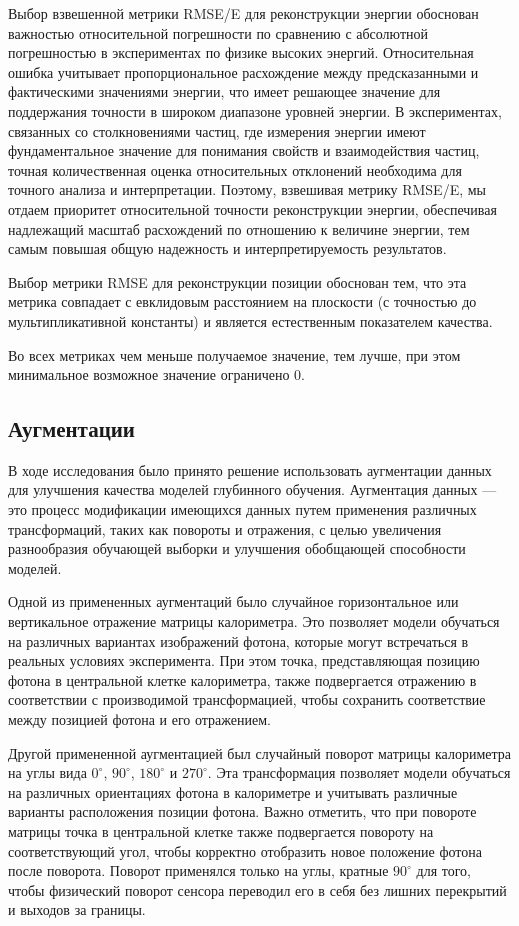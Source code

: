 \documentclass[a4paper,12pt]{extarticle}
\begin{document}
Выбор взвешенной метрики \textsf{RMSE/E} для реконструкции энергии обоснован важностью относительной погрешности по сравнению с абсолютной погрешностью в экспериментах по физике высоких энергий. Относительная ошибка учитывает пропорциональное расхождение между предсказанными и фактическими значениями энергии, что имеет решающее значение для поддержания точности в широком диапазоне уровней энергии. В экспериментах, связанных со столкновениями частиц, где измерения энергии имеют фундаментальное значение для понимания свойств и взаимодействия частиц, точная количественная оценка относительных отклонений необходима для точного анализа и интерпретации. Поэтому, взвешивая метрику \textsf{RMSE/E}, мы отдаем приоритет относительной точности реконструкции энергии, обеспечивая надлежащий масштаб расхождений по отношению к величине энергии, тем самым повышая общую надежность и интерпретируемость результатов.

Выбор метрики \textsf{RMSE} для реконструкции позиции обоснован тем, что эта метрика совпадает с евклидовым расстоянием на плоскости (с точностью до мультипликативной константы) и является естественным показателем качества.

Во всех метриках чем меньше получаемое значение, тем лучше, при этом минимальное возможное значение ограничено $0$.

\subsection{Аугментации}
\label{subsection:augmentations}

В ходе исследования было принято решение использовать аугментации данных для улучшения качества моделей глубинного обучения. Аугментация данных --- это процесс модификации имеющихся данных путем применения различных трансформаций, таких как повороты и отражения, с целью увеличения разнообразия обучающей выборки и улучшения обобщающей способности моделей.

Одной из примененных аугментаций было случайное горизонтальное или вертикальное отражение матрицы калориметра. Это позволяет модели обучаться на различных вариантах изображений фотона, которые могут встречаться в реальных условиях эксперимента. При этом точка, представляющая позицию фотона в центральной клетке калориметра, также подвергается отражению в соответствии с производимой трансформацией, чтобы сохранить соответствие между позицией фотона и его отражением.

Другой примененной аугментацией был случайный поворот матрицы калориметра на углы вида $0^{\circ}$, $90^{\circ}$, $180^{\circ}$ и $270^{\circ}$. Эта трансформация позволяет модели обучаться на различных ориентациях фотона в калориметре и учитывать различные варианты расположения позиции фотона. Важно отметить, что при повороте матрицы точка в центральной клетке также подвергается повороту на соответствующий угол, чтобы корректно отобразить новое положение фотона после поворота. Поворот применялся только на углы, кратные $90^{\circ}$ для того, чтобы физический поворот сенсора переводил его в себя без лишних перекрытий и выходов за границы.
\end{document}
